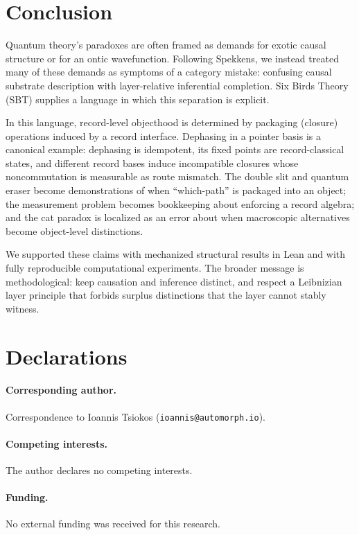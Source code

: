 \section{Conclusion}\label{sec:conclusion}

Quantum theory's paradoxes are often framed as demands for exotic causal structure or for an ontic wavefunction.
Following Spekkens, we instead treated many of these demands as symptoms of a category mistake: confusing causal substrate description with layer-relative inferential completion.
Six Birds Theory (SBT) supplies a language in which this separation is explicit.

In this language, record-level objecthood is determined by packaging (closure) operations induced by a record interface.
Dephasing in a pointer basis is a canonical example: dephasing is idempotent, its fixed points are record-classical states, and different record bases induce incompatible closures whose noncommutation is measurable as route mismatch.
The double slit and quantum eraser become demonstrations of when ``which-path'' is packaged into an object; the measurement problem becomes bookkeeping about enforcing a record algebra; and the cat paradox is localized as an error about when macroscopic alternatives become object-level distinctions.

We supported these claims with mechanized structural results in Lean and with fully reproducible computational experiments.
The broader message is methodological: keep causation and inference distinct, and respect a Leibnizian layer principle that forbids surplus distinctions that the layer cannot stably witness.

\section*{Declarations}

\paragraph{Corresponding author.}
Correspondence to Ioannis Tsiokos (\texttt{ioannis@automorph.io}).

\paragraph{Competing interests.}
The author declares no competing interests.

\paragraph{Funding.}
No external funding was received for this research.

